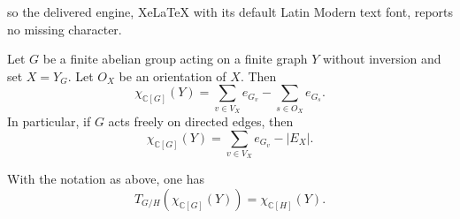 \documentclass[10pt,a4paper]{amsart}
\begin{document}
so the delivered engine, XeLaTeX with its default Latin Modern text font, reports no missing character.
\begin{theorem} \label{exp_equi_euler_char}
Let $G$ be a finite abelian group acting on a finite graph $Y$ without inversion and set $X = Y_{G}$.  Let $O_{X}$ be an orientation of $X$.  Then
$$\chi_{\mathbb{C}[G]}(Y) = \sum_{v \in V_{X}} e_{G_{v}} - \sum_{s \in O_{X}}e_{G_{s}}.$$
In particular, if $G$ acts freely on directed edges, then
$$\chi_{\mathbb{C}[G]}(Y) = \sum_{v \in V_{X}} e_{G_{v}} - |E_{X}|.$$
\end{theorem}

\begin{lemma} \label{eul_and_T}
With the notation as above, one has
$$T_{G/H}(\chi_{\mathbb{C}[G]}(Y)) = \chi_{\mathbb{C}[H]}(Y). $$
\end{lemma}
\end{document}
